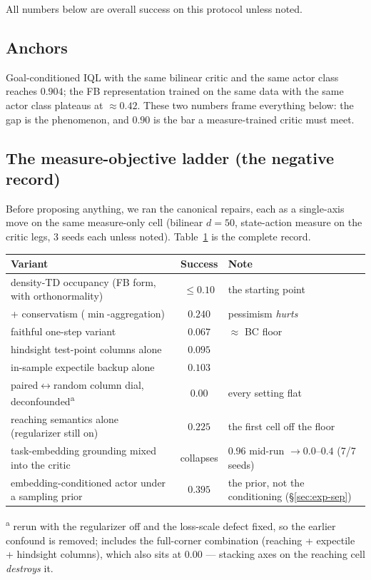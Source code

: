 \documentclass[10pt]{article}
\begin{document}
All numbers below are overall success on this protocol unless noted.

\subsection{Anchors}
\label{sec:exp-anchors}

Goal-conditioned IQL with the same bilinear critic and the same actor class reaches
$\mathbf{0.904}$; the FB representation trained on the same data with the same actor
class plateaus at $\approx 0.42$.
These two numbers frame everything below: the gap is the phenomenon, and $0.90$ is the
bar a measure-trained critic must meet.

\subsection{The measure-objective ladder (the negative record)}
\label{sec:exp-ladder}

Before proposing anything, we ran the canonical repairs, each as a single-axis move on
the same measure-only cell (bilinear $d{=}50$, state-action measure on the critic legs,
3 seeds each unless noted).
Table~\ref{tab:ladder} is the complete record.

\begin{table}[h]
\centering
\small
\setlength{\tabcolsep}{6pt}
\renewcommand{\arraystretch}{1.12}
\begin{tabular}{l c l}
\toprule
\textbf{Variant} & \textbf{Success} & \textbf{Note} \\
\midrule
density-TD occupancy (FB form, with orthonormality) & $\le 0.10$ & the starting point \\
\quad + conservatism ($\min$-aggregation) & $0.240$ & pessimism \emph{hurts} \\
\quad faithful one-step variant & $0.067$ & $\approx$ BC floor \\
\quad hindsight test-point columns alone & $0.095$ & \\
\quad in-sample expectile backup alone & $0.103$ & \\
\quad paired$\leftrightarrow$random column dial, deconfounded\textsuperscript{a} & $0.00$ & every setting flat \\
\quad reaching semantics alone (regularizer still on) & $0.225$ & the first cell off the floor \\
task-embedding grounding mixed into the critic & collapses & $0.96$ mid-run $\to 0.0$--$0.4$ (7/7 seeds) \\
embedding-conditioned actor under a sampling prior & $0.395$ & the prior, not the conditioning (\S\ref{sec:exp-sep}) \\
\bottomrule
\end{tabular}

\vspace{2pt}
\raggedright\footnotesize
\textsuperscript{a} rerun with the regularizer off and the loss-scale defect fixed, so
the earlier confound is removed; includes the full-corner combination (reaching +
expectile + hindsight columns), which also sits at $0.00$ --- stacking axes on the
reaching cell \emph{destroys} it.
\label{tab:ladder}
\end{table}
\end{document}
